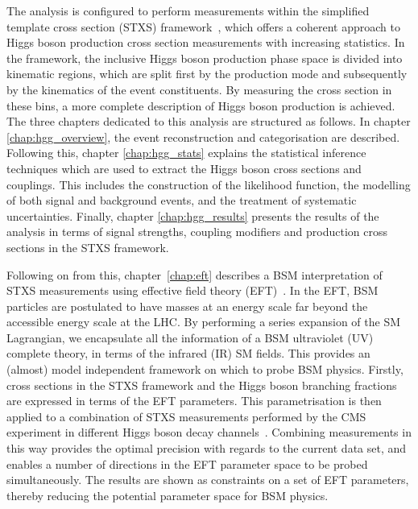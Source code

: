 The \Hgg analysis is configured to perform measurements within the simplified template cross section (STXS) framework~\cite{deFlorian:2016spz}, which offers a coherent approach to Higgs boson production cross section measurements with increasing statistics. In the framework, the inclusive Higgs boson production phase space is divided into kinematic regions, which are split first by the production mode and subsequently by the kinematics of the event constituents. By measuring the cross section in these bins, a more complete description of Higgs boson production is achieved. The three chapters dedicated to this analysis are structured as follows. In chapter \ref{chap:hgg_overview}, the event reconstruction and categorisation are described. Following this, chapter \ref{chap:hgg_stats} explains the statistical inference techniques which are used to extract the Higgs boson cross sections and couplings. This includes the construction of the likelihood function, the modelling of both signal and background events, and the treatment of systematic uncertainties. Finally, chapter \ref{chap:hgg_results} presents the results of the analysis in terms of signal strengths, coupling modifiers and production cross sections in the STXS framework.

Following on from this, chapter~\ref{chap:eft} describes a BSM interpretation of STXS measurements using effective field theory (EFT)~\cite{BUCHMULLER1986621,Hagiwara:1993qt,Giudice_2007,Grzadkowski:2010es,Contino:2013kra}. In the EFT, BSM particles are postulated to have masses at an energy scale far beyond the accessible energy scale at the LHC. By performing a series expansion of the SM Lagrangian, we encapsulate all the information of a BSM ultraviolet (UV) complete theory, in terms of the infrared (IR) SM fields. This provides an (almost) model independent framework on which to probe BSM physics. Firstly, cross sections in the STXS framework and the Higgs boson branching fractions are expressed in terms of the EFT parameters. This parametrisation is then applied to a combination of STXS measurements performed by the CMS experiment in different Higgs boson decay channels~\cite{CMS-PAS-HIG-19-005}. Combining measurements in this way provides the optimal precision with regards to the current data set, and enables a number of directions in the EFT parameter space to be probed simultaneously. The results are shown as constraints on a set of EFT parameters, thereby reducing the potential parameter space for BSM physics.

